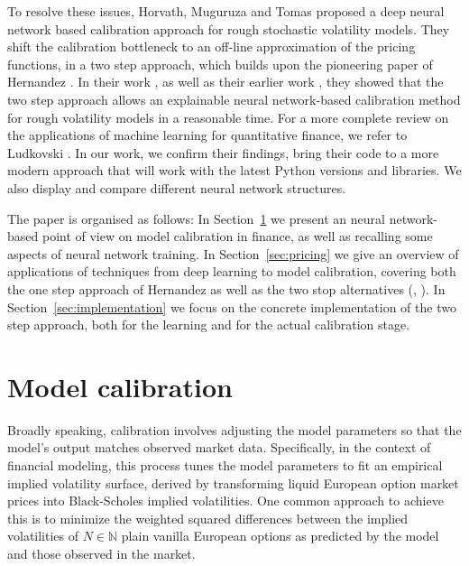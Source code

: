 \documentclass{article}
\theoremstyle{remark}
\begin{document}
To resolve these issues, Horvath, Muguruza and Tomas \cite{HMM19} proposed a deep neural network based calibration approach for rough stochastic volatility models.
They shift the calibration bottleneck to an off-line approximation of the pricing functions, in a two step approach,
which builds upon the pioneering paper of Hernandez \cite{Hernandez}.
In their work \cite{HMM19}, as well as their earlier work \cite{BHMST19}, they showed that the two step approach
allows an explainable neural network-based calibration method for rough volatility models in a reasonable time.
For a more complete review on the applications of machine learning for quantitative finance, we refer to Ludkovski \cite{Ludkovski}.
In our work, we confirm their findings, bring their code to a more modern approach that will work with the latest Python versions and libraries.
We also display and compare different neural network structures.

The paper is organised as follows:
In Section~\ref{sec:model-calibration} we present an neural network-based point of view on model calibration in finance,
as well as recalling some aspects of neural network training.
In Section~\ref{sec:pricing} we give an overview of applications of techniques from deep learning to model calibration,
covering both the one step approach of Hernandez \cite{Hernandez} as well as the two stop alternatives (\cite{HMM19}, \cite{BHMST19}).
In Section~\ref{sec:implementation} we focus on the concrete implementation of the two step approach,
both for the learning and for the actual calibration stage.

\section{Model calibration}
\label{sec:model-calibration}

Broadly speaking, calibration involves adjusting the model parameters so that the model's output matches 
observed market data.
Specifically, in the context of financial modeling, this process tunes the model parameters to fit an empirical implied volatility surface,
derived by transforming liquid European option market prices into Black-Scholes implied volatilities.
One common approach to achieve this is to minimize the weighted squared differences between the
implied volatilities of $N \in \mathbb{N}$ plain vanilla European options as predicted by the model and those observed in the market.
\end{document}
